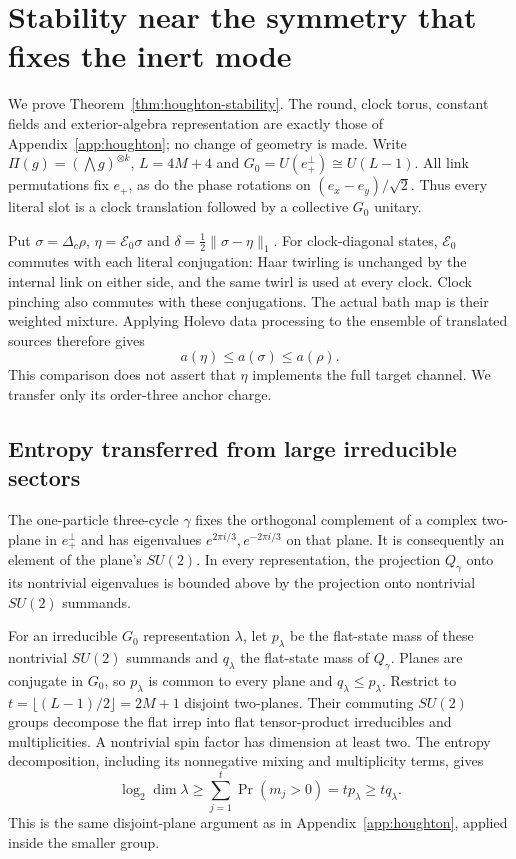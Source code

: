 \section{Stability near the symmetry that fixes the inert mode}
\label{app:houghton-stability}

We prove Theorem~\ref{thm:houghton-stability}. The round, clock torus,
constant fields and exterior-algebra representation are exactly those
of Appendix~\ref{app:houghton}; no change of geometry is made.
Write $\Pi(g)=(\bigwedge g)^{\otimes k}$, $L=4M+4$ and
$G_0=U(e_+^\perp)\cong U(L-1)$. All link permutations fix $e_+$,
as do the phase rotations on $(e_x-e_y)/\sqrt2$. Thus every literal
slot is a clock translation followed by a collective $G_0$ unitary.

Put $\sigma=\Delta_c\rho$, $\eta=\mathcal E_0\sigma$ and
$\delta=\frac12\|\sigma-\eta\|_1$. For clock-diagonal states,
$\mathcal E_0$ commutes with each literal conjugation: Haar twirling
is unchanged by the internal link on either side, and the same twirl
is used at every clock. Clock pinching also commutes with these
conjugations. The actual bath map is their weighted mixture.
Applying Holevo data processing to the ensemble of translated sources
therefore gives
\begin{equation}\label{eq:inert-twirl-gain}
 a(\eta)\leq a(\sigma)\leq a(\rho).
\end{equation}
This comparison does not assert that $\eta$ implements the full target
channel. We transfer only its order-three anchor charge.

\subsection{Entropy transferred from large irreducible sectors}

The one-particle three-cycle $\gamma$ fixes the orthogonal complement
of a complex two-plane in $e_+^\perp$ and has eigenvalues
$e^{2\pi i/3},e^{-2\pi i/3}$ on that plane. It is consequently an
element of the plane's $SU(2)$. In every representation, the projection
$Q_\gamma$ onto its nontrivial eigenvalues is bounded above by the
projection onto nontrivial $SU(2)$ summands.

For an irreducible $G_0$ representation $\lambda$, let $p_\lambda$ be
the flat-state mass of these nontrivial $SU(2)$ summands and
$q_\lambda$ the flat-state mass of $Q_\gamma$. Planes are conjugate in
$G_0$, so $p_\lambda$ is common to every plane and
$q_\lambda\leq p_\lambda$. Restrict to
$t=\lfloor(L-1)/2\rfloor=2M+1$ disjoint two-planes. Their commuting
$SU(2)$ groups decompose the flat irrep into flat tensor-product
irreducibles and multiplicities. A nontrivial spin factor has
dimension at least two. The entropy decomposition, including its
nonnegative mixing and multiplicity terms, gives
\begin{equation}\label{eq:inert-irrep-dimension}
 \log_2\dim\lambda\geq\sum_{j=1}^t\Pr(m_j>0)
                  =t p_\lambda\geq t q_\lambda.
\end{equation}
This is the same disjoint-plane argument as in
Appendix~\ref{app:houghton}, applied inside the smaller group.

